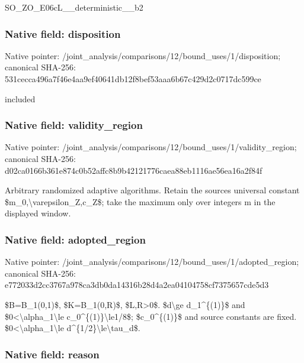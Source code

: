 \documentclass[10pt,a4paper]{article}
\begin{document}
SO\_ZO\_E06cL\_\_deterministic\_\_b2


\subsubsection{Native field: disposition}


Native pointer: /joint\_analysis/comparis\allowbreak{}ons/12/bound\_uses/1/disp\allowbreak{}osition; canonical SHA-256: 531cecca496a7f46e4aa9ef4\allowbreak{}0641db12f8bef53aaa6b67c4\allowbreak{}29d2c0717dc599ce


included


\subsubsection{Native field: validity\_region}


Native pointer: /joint\_analysis/comparis\allowbreak{}ons/12/bound\_uses/1/vali\allowbreak{}dity\_region; canonical SHA-256: d02ca0166b361e874c0b52af\allowbreak{}fc8b9b42121776caea88eb11\allowbreak{}16ae56ea16a2f84f


Arbitrary randomized adaptive algorithms. Retain the sources universal constant \$m\_0,\textbackslash{}varepsilon\_Z,c\_Z\$; take the maximum only over integers m in the displayed window.


\subsubsection{Native field: adopted\_region}


Native pointer: /joint\_analysis/comparis\allowbreak{}ons/12/bound\_uses/1/adop\allowbreak{}ted\_region; canonical SHA-256: e772033d2cc3767a978ca3db\allowbreak{}0da14316b28d4a2ea0410475\allowbreak{}8cf7375657cde5d3


\$B=B\_1(0,1)\$, \$K=B\_1(0,R)\$, \$L,R>0\$. \$d\textbackslash{}ge d\_1\textasciicircum{}\{(1)\}\$ and \$0<\textbackslash{}alpha\_1\textbackslash{}le c\_0\textasciicircum{}\{(1)\}\textbackslash{}le1/8\$; \$c\_0\textasciicircum{}\{(1)\}\$ and source constants are fixed. \$0<\textbackslash{}alpha\_1\textbackslash{}le d\textasciicircum{}\{1/2\}\textbackslash{}le\textbackslash{}tau\_d\$.


\subsubsection{Native field: reason}
\end{document}
